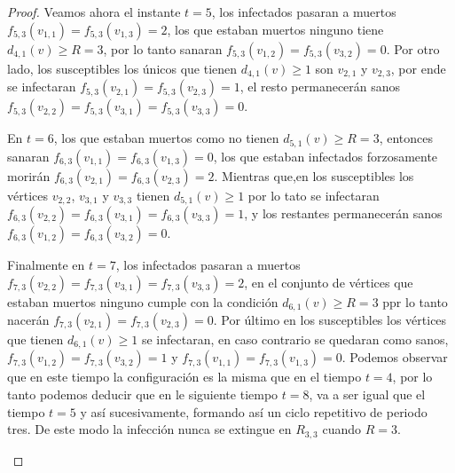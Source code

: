 \documentclass[12pt,titlepage,twoside,openright]{book}
\begin{document}
\begin{proof}
    Veamos ahora el instante $t=5$, los infectados pasaran a muertos $f_{5,3}(v_{1,1})=f_{5,3}(v_{1,3})=2$, los que estaban muertos ninguno tiene $d_{4,1}(v)\geq R=3$, por lo tanto sanaran $f_{5,3}(v_{1,2})=f_{5,3}(v_{3,2})=0$. Por otro lado, los susceptibles los \'unicos que tienen $d_{4,1}(v)\geq 1$ son $v_{2,1}$ y $v_{2,3}$, por ende se infectaran $f_{5,3}(v_{2,1})=f_{5,3}(v_{2,3})=1$, el resto permanecer\'an sanos $f_{5,3}(v_{2,2})=f_{5,3}(v_{3,1})=f_{5,3}(v_{3,3})=0$.

    En $t=6$, los que estaban muertos como no tienen $d_{5,1}(v)\geq R=3$, entonces sanaran $f_{6,3}(v_{1,1})=f_{6,3}(v_{1,3})=0$, los que estaban infectados forzosamente morir\'an $f_{6,3}(v_{2,1})=f_{6,3}(v_{2,3})=2$. Mientras que,en los susceptibles los v\'ertices $v_{2,2}$, $v_{3,1}$ y $v_{3,3}$ tienen $d_{5,1}(v)\geq 1$ por lo tato se infectaran $f_{6,3}(v_{2,2})=f_{6,3}(v_{3,1})=f_{6,3}(v_{3,3})=1$, y los restantes permanecer\'an sanos $f_{6,3}(v_{1,2})=f_{6,3}(v_{3,2})=0$.

    Finalmente en $t=7$, los infectados pasaran a muertos $f_{7,3}(v_{2,2})=f_{7,3}(v_{3,1})=f_{7,3}(v_{3,3})=2$, en el conjunto de v\'ertices que estaban muertos ninguno cumple con la condici\'on $d_{6,1}(v)\geq R=3$ ppr lo tanto nacer\'an $f_{7,3}(v_{2,1})=f_{7,3}(v_{2,3})=0$. Por \'ultimo en los susceptibles los v\'ertices que tienen  $d_{6,1}(v)\geq 1$ se infectaran, en caso contrario se quedaran como sanos, $f_{7,3}(v_{1,2})=f_{7,3}(v_{3,2})=1$ y $f_{7,3}(v_{1,1})=f_{7,3}(v_{1,3})=0$. Podemos observar que en este tiempo la configuraci\'on es la misma que en el tiempo $t=4$, por lo tanto podemos deducir que  en le siguiente tiempo $t=8$, va a ser igual que el tiempo $t=5$ y as\'i sucesivamente, formando as\'i un ciclo repetitivo de periodo tres. De este modo la infecci\'on nunca se extingue en $R_{3,3}$ cuando $R = 3$.

    \begin{figure}[h]
    \centering
\end{figure}
\end{proof}
\end{document}
